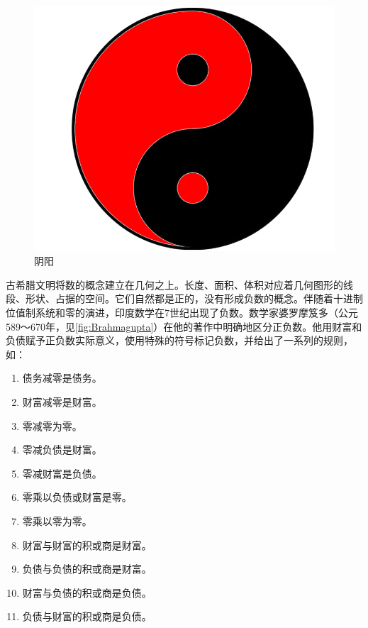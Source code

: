 \documentclass[b5paper]{ctexart}
\begin{document}
\begin{figure}[htbp]
 \centering
 \includegraphics[scale=0.1]{img/yinyang}
 \caption{阴阳}
 \label{fig:yinyang}
\end{figure}

古希腊文明将数的概念建立在几何之上。长度、面积、体积对应着几何图形的线段、形状、占据的空间。它们自然都是正的，没有形成负数的概念。伴随着十进制位值制系统和零的演进，印度数学在7世纪出现了负数。数学家婆罗摩笈多（公元589～670年，见\cref{fig:Brahmagupta}）在他的著作中明确地区分正负数。他用财富和负债赋予正负数实际意义，使用特殊的符号标记负数，并给出了一系列的规则，如\cite{Rogers-2011}：

\begin{multicols}{2}
\begin{enumerate}[1)]
\item 债务减零是债务。
\item 财富减零是财富。
\item 零减零为零。
\item 零减负债是财富。
\item 零减财富是负债。
\item 零乘以负债或财富是零。
\item 零乘以零为零。
\item 财富与财富的积或商是财富。
\item 负债与负债的积或商是财富。
\item 财富与负债的积或商是负债。
\item 负债与财富的积或商是负债。
\end{enumerate}
\end{multicols}
\end{document}
